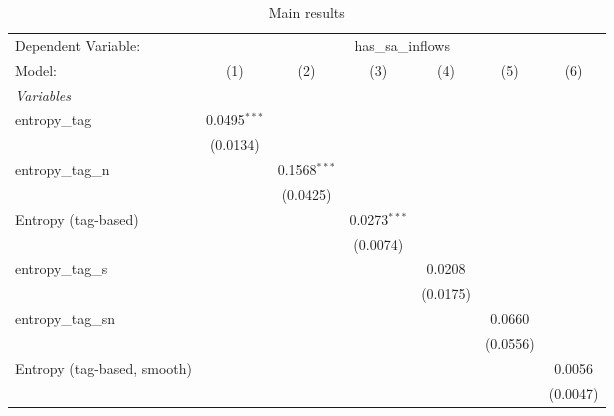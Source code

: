
\begin{table}[htbp]
   \centering
   \caption{\label{tab:reg_has_sa_inflows_tag.tex} Main results}
   \begin{footnotesize}
      \begin{tabular}{lcccccc}
         \tabularnewline\midrule\midrule
         Dependent Variable: & \multicolumn{6}{c}{has\_sa\_inflows}\\
         Model:                      & (1)            & (2)            & (3)            & (4)            & (5)            & (6)\\
         \midrule \emph{Variables} &   &   &   &   &   &  \\
         entropy\_tag               & 0.0495$^{***}$ &                &                &                &                &   \\
                                     & (0.0134)       &                &                &                &                &   \\
         entropy\_tag\_n           &                & 0.1568$^{***}$ &                &                &                &   \\
                                     &                & (0.0425)       &                &                &                &   \\
         Entropy (tag-based)         &                &                & 0.0273$^{***}$ &                &                &   \\
                                     &                &                & (0.0074)       &                &                &   \\
         entropy\_tag\_s           &                &                &                & 0.0208         &                &   \\
                                     &                &                &                & (0.0175)       &                &   \\
         entropy\_tag\_sn          &                &                &                &                & 0.0660         &   \\
                                     &                &                &                &                & (0.0556)       &   \\
         Entropy (tag-based, smooth) &                &                &                &                &                & 0.0056\\
                                     &                &                &                &                &                & (0.0047)\\

\end{tabular}
\end{footnotesize}
\end{table}
